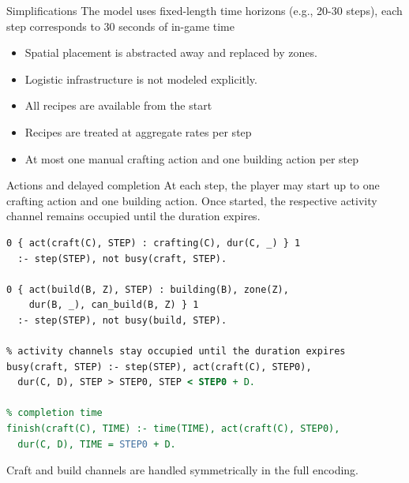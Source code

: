 \documentclass[aspectratio=169]{beamer}
\begin{document}
\begin{frame}{Simplifications}
The model uses fixed-length time horizons (e.g., 20-30 steps), each step corresponds to 30 seconds of in-game time

\vspace{0.6em}
\begin{itemize}
    \item Spatial placement is abstracted away and replaced by zones.
    \item Logistic infrastructure is not modeled explicitly.
    \item All recipes are available from the start
    \item Recipes are treated at aggregate rates per step
    \item At most one manual crafting action and one building action per step
\end{itemize}
\end{frame}

\begin{frame}[fragile]{Actions and delayed completion}
At each step, the player may start up to one crafting action and one building action. Once started, the respective activity channel remains occupied until the duration expires.

\vspace{0.4em}
\begin{lstlisting}[language=asp]
% at most one craft and one build action per step
0 { act(craft(C), STEP) : crafting(C), dur(C, _) } 1
  :- step(STEP), not busy(craft, STEP).

0 { act(build(B, Z), STEP) : building(B), zone(Z),
    dur(B, _), can_build(B, Z) } 1
  :- step(STEP), not busy(build, STEP).

% activity channels stay occupied until the duration expires
busy(craft, STEP) :- step(STEP), act(craft(C), STEP0),
  dur(C, D), STEP > STEP0, STEP < STEP0 + D.

% completion time
finish(craft(C), TIME) :- time(TIME), act(craft(C), STEP0),
  dur(C, D), TIME = STEP0 + D.
\end{lstlisting}

\vspace{0.2em}
{\small Craft and build channels are handled symmetrically in the full encoding.}
\end{frame}
\end{document}

